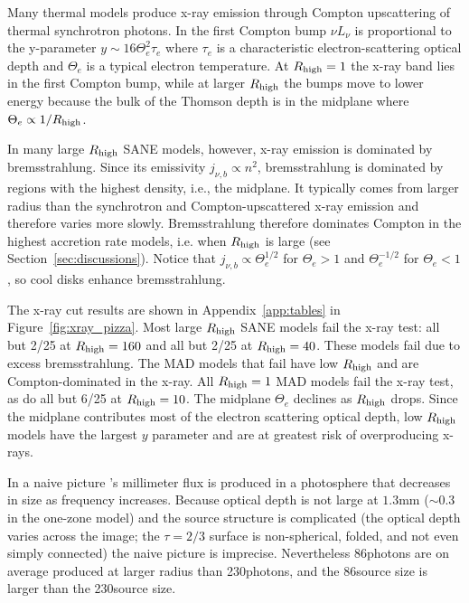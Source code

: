 Many thermal models produce x-ray emission through Compton upscattering of thermal synchrotron photons.  In the first Compton bump $\nu L_\nu$ is proportional to the y-parameter $y \sim 16 \Theta_e^2 \tau_e$ where $\tau_e$ is a characteristic electron-scattering optical depth and $\Theta_e$ is a typical electron temperature.  At $R_\mathrm{high} = 1$ the x-ray band lies in the first Compton bump, while at larger $R_\mathrm{high}$ the bumps move to lower energy because the bulk of the Thomson depth is in the midplane where $\Theta_e \propto 1/R_\mathrm{high}$.

In many large $R_\mathrm{high}$ SANE models, however, x-ray emission is dominated by bremsstrahlung.  Since its emissivity $j_{\nu,b} \propto n^2$, bremsstrahlung is dominated by regions with the highest density, i.e., the midplane.  It typically comes from larger radius than the synchrotron and Compton-upscattered x-ray emission and therefore varies more slowly.  Bremsstrahlung therefore dominates Compton in the highest accretion rate models, i.e. when $R_\mathrm{high}$ is large (see Section~\ref{sec:discussions}).  Notice that $j_{\nu,b} \propto \Theta_e^{1/2}$ for $\Theta_e > 1$ and $\Theta_e^{-1/2}$ for $\Theta_e < 1$, so cool disks enhance bremsstrahlung.

The x-ray cut results are shown in Appendix~\ref{app:tables} in Figure~\ref{fig:xray_pizza}. Most large $R_\mathrm{high}$ SANE models fail the x-ray test: all but 2/25 at $R_\mathrm{high} = 160$ and all but 2/25 at $R_\mathrm{high} = 40$.  These models fail due to excess bremsstrahlung. The MAD models that fail have low $R_\mathrm{high}$ and are Compton-dominated in the x-ray.  All $R_\mathrm{high} = 1$ MAD models fail the x-ray test, as do all but 6/25 at $R_\mathrm{high} = 10$.  The midplane $\Theta_e$ declines as $R_\mathrm{high}$ drops.  Since the midplane contributes most of the electron scattering optical depth, low $R_\mathrm{high}$ models have the largest $y$ parameter and are at greatest risk of overproducing x-rays.



In a naive picture \sgra's millimeter flux is produced in a photosphere that decreases in size as frequency increases.  Because optical depth is not large at $1.3$mm ($\sim 0.3$ in the one-zone model) and the source structure is complicated (the optical depth varies across the image; the $\tau = 2/3$ surface is non-spherical, folded, and not even simply connected) the naive picture is imprecise.  Nevertheless 86\GHz photons are on average produced at larger radius than 230\GHz photons, and the 86\GHz source size is larger than the 230\GHz source size.

